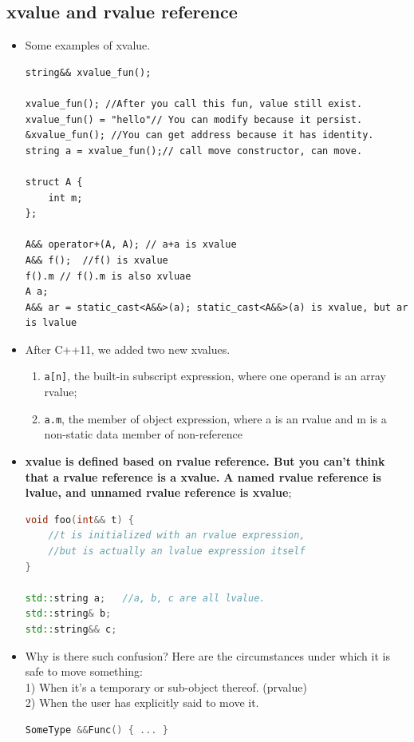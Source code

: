 \documentclass[a4paper,11pt,twoside]{book}
\begin{document}
\subsection{xvalue and rvalue reference}
\begin{itemize}
    \item Some examples of xvalue.
\begin{lstlisting}
string&& xvalue_fun();

xvalue_fun(); //After you call this fun, value still exist. 
xvalue_fun() = "hello"// You can modify because it persist.
&xvalue_fun(); //You can get address because it has identity.
string a = xvalue_fun();// call move constructor, can move.

struct A {
	int m;
};

A&& operator+(A, A); // a+a is xvalue
A&& f();  //f() is xvalue
f().m // f().m is also xvluae
A a;
A&& ar = static_cast<A&&>(a); static_cast<A&&>(a) is xvalue, but ar is lvalue
\end{lstlisting}
		
	\item After C++11, we added two new xvalues.
	\begin{enumerate}
		\item \texttt{a[n]}, the built-in subscript expression, where one operand is an array rvalue;
		\item \texttt{a.m}, the member of object expression, where a is an rvalue and m is a non-static data member of non-reference
	\end{enumerate}

	\item \textbf{xvalue is defined based on rvalue reference. But you can't think that a rvalue reference is a xvalue. }  \textbf{A named rvalue reference is lvalue, and unnamed rvalue reference is xvalue};
	
\begin{lstlisting}[frame=single, language=c++,mathescape=true]
void foo(int&& t) {
	//t is initialized with an rvalue expression, 
	//but is actually an lvalue expression itself
}
	
std::string a;   //a, b, c are all lvalue.
std::string& b;
std::string&& c;
\end{lstlisting}
	

	\item Why is there such confusion? Here are the circumstances under which it is safe to move something:\\
	1) When it's a temporary or sub-object thereof. (prvalue) \\
	2) When the user has explicitly said to move it.
\begin{lstlisting}[frame=single, language=c++]
SomeType &&Func() { ... }
	

\end{lstlisting}
\end{itemize}
\end{document}
